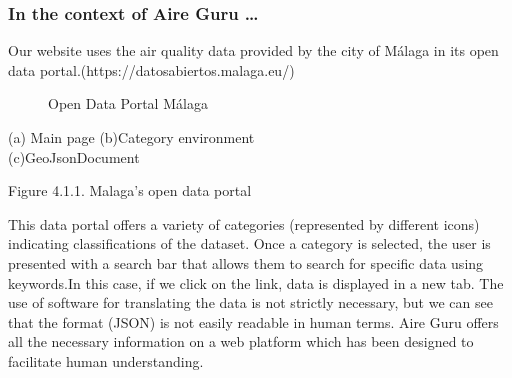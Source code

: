 \subsubsection*{In the context of Aire Guru \ldots} 

Our website uses the air quality data provided by the city of Málaga in its open data portal.(https://datosabiertos.malaga.eu/)\\

\begin{figure}[ht]
    \centering
    \hfill
    \vfill
    \caption{Open Data Portal Málaga}
\end{figure}


\begin{center}
    \bf{ (a) Main page     (b)Category environment\\
    (c)GeoJsonDocument
        
    Figure 4.1.1. Malaga's open data portal}
\end{center}

This data portal offers a variety of categories (represented by different icons) indicating classifications of the dataset.
Once a category is selected, the user is presented with a search bar that allows them to search for specific data using keywords.In 
this case, if we click on the link, data is displayed in a new tab. The use of software
for translating the data is not strictly necessary, but we can see that the format (JSON) is not easily readable in human terms.
Aire Guru offers all the necessary information on a web platform which has been designed to facilitate human understanding. \\